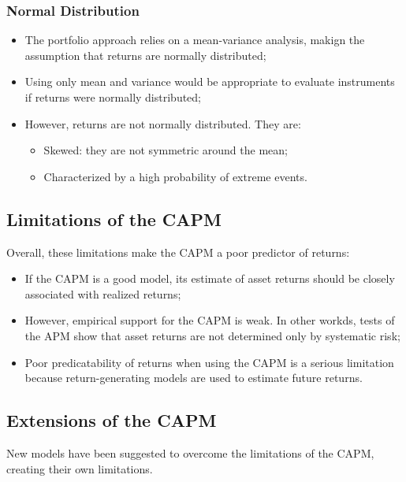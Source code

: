 \documentclass[11pt,a4paper]{report}
\begin{document}
\subsubsection{Normal Distribution}
\begin{itemize}
    \item The portfolio approach relies on a mean-variance analysis, makign the assumption that returns are normally distributed;
    \item Using only mean and variance would be appropriate to evaluate instruments if returns were normally distributed;
    \item However, returns are not normally distributed. They are:
    \begin{itemize}
        \item Skewed: they are not symmetric around the mean;
        \item Characterized by a high probability of extreme events.
    \end{itemize}
\end{itemize}
\subsection{Limitations of the CAPM}
Overall, these limitations make the CAPM a poor predictor of returns:
\begin{itemize}
    \item If the CAPM is a good model, its estimate of asset returns should be closely associated with realized returns;
    \item However, empirical support for the CAPM is weak. In other workds, tests of the APM show that asset returns are not determined only by systematic risk;
    \item Poor predicatability of returns when using the CAPM is a serious limitation because return-generating models are used to estimate future returns.
\end{itemize}
\subsection{Extensions of the CAPM}
New models have been suggested to overcome the limitations of the CAPM, creating their own limitations.
\end{document}
